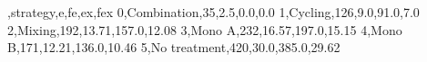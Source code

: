 ,strategy,e,fe,ex,fex
0,Combination,35,2.5,0.0,0.0
1,Cycling,126,9.0,91.0,7.0
2,Mixing,192,13.71,157.0,12.08
3,Mono A,232,16.57,197.0,15.15
4,Mono B,171,12.21,136.0,10.46
5,No treatment,420,30.0,385.0,29.62
